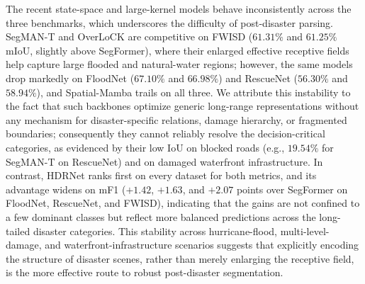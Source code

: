 \documentclass[lettersize,journal]{IEEEtran}
\begin{document}
The recent state-space and large-kernel models behave inconsistently across the three benchmarks, which underscores the difficulty of post-disaster parsing. SegMAN-T and OverLoCK are competitive on FWISD ($61.31\%$ and $61.25\%$ mIoU, slightly above SegFormer), where their enlarged effective receptive fields help capture large flooded and natural-water regions; however, the same models drop markedly on FloodNet ($67.10\%$ and $66.98\%$) and RescueNet ($56.30\%$ and $58.94\%$), and Spatial-Mamba trails on all three. We attribute this instability to the fact that such backbones optimize generic long-range representations without any mechanism for disaster-specific relations, damage hierarchy, or fragmented boundaries; consequently they cannot reliably resolve the decision-critical categories, as evidenced by their low IoU on blocked roads (e.g., $19.54\%$ for SegMAN-T on RescueNet) and on damaged waterfront infrastructure. In contrast, HDRNet ranks first on every dataset for both metrics, and its advantage widens on mF1 ($+1.42$, $+1.63$, and $+2.07$ points over SegFormer on FloodNet, RescueNet, and FWISD), indicating that the gains are not confined to a few dominant classes but reflect more balanced predictions across the long-tailed disaster categories. This stability across hurricane-flood, multi-level-damage, and waterfront-infrastructure scenarios suggests that explicitly encoding the structure of disaster scenes, rather than merely enlarging the receptive field, is the more effective route to robust post-disaster segmentation.
\end{document}
